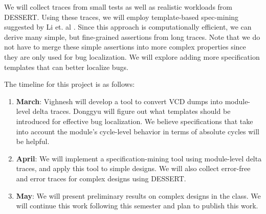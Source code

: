 \documentclass[11pt]{article}
\begin{document}
We will collect traces from small tests as well as realistic workloads from DESSERT. Using these traces, we will employ template-based spec-mining suggested by Li et. al \supercite{Li2010}. Since this approach is computationally efficient, we can derive many simple, but fine-grained assertions from long traces. Note that we do not have to merge these simple assertions into more complex properties since they are only used for bug localization. We will explore adding more specification templates that can better localize bugs.

The timeline for this project is as follows:
\begin{enumerate}
  \item \textbf{March}: Vighnesh will develop a tool to convert VCD dumps into module-level delta traces. Donggyu will figure out what templates should be introduced for effective bug localization. We believe specifications that take into account the module's cycle-level behavior in terms of absolute cycles will be helpful.
  \item \textbf{April}: We will implement a specification-mining tool using module-level delta traces, and apply this tool to simple designs. We will also collect error-free and error traces for complex designs using DESSERT.
  \item \textbf{May}: We will present preliminary results on complex designs in the class. We will continue this work following this semester and plan to publish this work.
\end{enumerate}

\printbibliography
\end{document}
